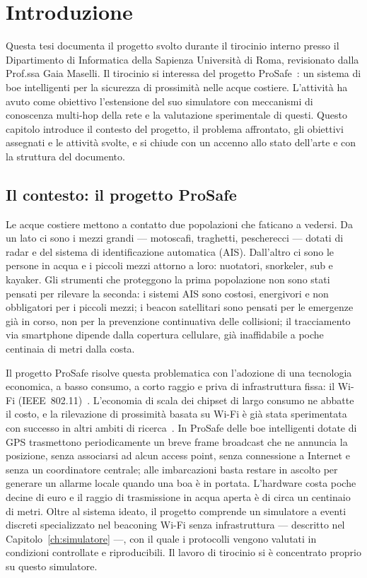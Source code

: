 \chapter{Introduzione}
\label{ch:introduzione}

Questa tesi documenta il progetto svolto durante il tirocinio interno presso
il Dipartimento di Informatica della Sapienza Universit\`a di Roma, revisionato
dalla Prof.ssa Gaia Maselli. Il tirocinio si interessa del
progetto ProSafe~\cite{prosafe}: un sistema di boe intelligenti per la
sicurezza di prossimit\`a nelle acque costiere. L'attivit\`a ha avuto come obiettivo
l'estensione del suo simulatore con meccanismi di conoscenza multi-hop della
rete e la valutazione sperimentale di questi. Questo capitolo introduce il
contesto del progetto, il problema affrontato, gli obiettivi assegnati e le
attivit\`a svolte, e si chiude con un accenno allo stato dell'arte e con la
struttura del documento.

\section{Il contesto: il progetto ProSafe}
\label{sec:intro-contesto}
Le acque costiere mettono a contatto due popolazioni che faticano a vedersi.
Da un lato ci sono i mezzi grandi --- motoscafi, traghetti, pescherecci ---
dotati di radar e del sistema di identificazione automatica (AIS). Dall'altro
ci sono le persone in acqua e i piccoli mezzi attorno a loro: nuotatori,
snorkeler, sub e kayaker. Gli strumenti che proteggono la prima
popolazione non sono stati pensati per rilevare la seconda: i sistemi AIS
sono costosi, energivori e non obbligatori per i piccoli mezzi; i beacon
satellitari sono pensati per le emergenze gi\`a in corso, non per la
prevenzione continuativa delle collisioni; il tracciamento
via smartphone dipende dalla copertura cellulare, gi\`a inaffidabile a poche
centinaia di metri dalla costa.

Il progetto ProSafe risolve questa problematica con l'adozione di 
una tecnologia economica, a basso consumo, a corto raggio e priva di
infrastruttura fissa: il Wi-Fi (IEEE~802.11)~\cite{ieee80211}. L'economia di scala dei chipset
di largo consumo ne abbatte il costo, e la rilevazione di prossimit\`a basata
su Wi-Fi \`e gi\`a stata sperimentata con successo in altri
ambiti di ricerca~\cite{vanhyfte-proximity}. In ProSafe delle boe intelligenti dotate di
GPS trasmettono periodicamente un breve frame broadcast che ne annuncia la
posizione, senza associarsi ad alcun access point, senza connessione a
Internet e senza un coordinatore centrale; alle imbarcazioni basta restare in
ascolto per generare un allarme locale quando una boa \`e in portata.
L'hardware costa poche decine di euro e il raggio di trasmissione in acqua aperta \`e
di circa un centinaio di metri. Oltre al sistema ideato, il progetto comprende un simulatore a eventi discreti 
specializzato nel beaconing Wi-Fi senza infrastruttura --- descritto nel
Capitolo~\ref{ch:simulatore} ---, con il quale i protocolli vengono valutati in
condizioni controllate e riproducibili. Il lavoro di tirocinio si \`e concentrato proprio su questo simulatore.

